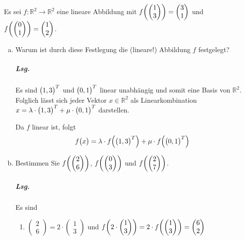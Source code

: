 \documentclass{scrreprt}
\begin{document}
Es sei $f \colon \mathbb{R}^2 \to \mathbb{R}^2$ eine lineare Abbildung mit
$f\qty(\begin{pmatrix} 1 \\ 3 \end{pmatrix})
= \begin{pmatrix} 3 \\ 1 \end{pmatrix}$ und
$f\qty(\begin{pmatrix} 0 \\ 1 \end{pmatrix})
= \begin{pmatrix} 1 \\ 2 \end{pmatrix}$.
\begin{enumerate}[(a)]
\item Warum ist durch diese Festlegung die (lineare!) Abbildung $f$ festgelegt?

  \subparagraph{Lsg.} Es sind $\qty\big(1, 3)^T$ und $\qty\big(0, 1)^T$ linear
  unabhängig und somit eine Basis von $\mathbb{R}^2$.
  Folglich lässt sich jeder Vektor $x \in \mathbb{R}^2$ als Linearkombination
  $x = \lambda \cdot \qty\big(1, 3)^T + \mu \cdot \qty\big(0, 1)^T$ darstellen.

  Da $f$ linear ist, folgt
  \[
    f\qty\big(x) = \lambda \cdot f \qty(\qty\big(1, 3)^T) +
    \mu \cdot f \qty(\qty\big(0, 1)^T)
  \]

\newpage
\item Bestimmen Sie $f\qty(\begin{pmatrix} 2 \\ 6 \end{pmatrix})$,
  $f\qty(\begin{pmatrix} 0 \\ 3 \end{pmatrix})$ und
  $f\qty(\begin{pmatrix} 2 \\ 7 \end{pmatrix})$.

  \subparagraph{Lsg.} Es sind
  \begin{enumerate}[(1)]
  \item $\begin{pmatrix} 2 \\ 6 \end{pmatrix}
    = 2 \cdot \begin{pmatrix} 1 \\ 3 \end{pmatrix}$ und
    $f\qty(2 \cdot \begin{pmatrix} 1 \\ 3 \end{pmatrix})
    = 2 \cdot f\qty(\begin{pmatrix} 1 \\ 3 \end{pmatrix})
    = \begin{pmatrix} 6 \\ 2 \end{pmatrix}$


\end{enumerate}
\end{enumerate}
\end{document}
